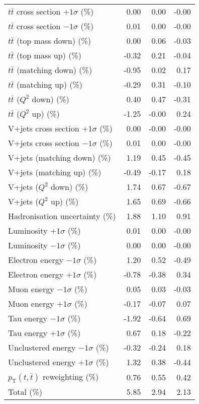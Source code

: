 \begin{table}[htbp]
{\begin{tabular}{lrrr}
$t\bar{t}$ cross section $+1\sigma$ (\%) & 0.00 & 0.00 & -0.00 \\ 
$t\bar{t}$ cross section $-1\sigma$ (\%) & 0.01 & 0.00 & -0.00 \\ 
$t\bar{t}$ (top mass down) (\%) & 0.00 & 0.06 & -0.03 \\ 
$t\bar{t}$ (top mass up) (\%) & -0.32 & 0.21 & -0.04 \\ 
$t\bar{t}$ (matching down) (\%) & -0.95 & 0.02 & 0.17 \\ 
$t\bar{t}$ (matching up) (\%) & -0.29 & 0.31 & -0.10 \\ 
$t\bar{t}$ ($Q^{2}$ down) (\%) & 0.40 & 0.47 & -0.31 \\ 
$t\bar{t}$ ($Q^{2}$ up) (\%) & -1.25 & -0.00 & 0.24 \\ 
V+jets cross section \ensuremath{+1\sigma} (\%) & 0.00 & -0.00 & -0.00 \\ 
V+jets cross section \ensuremath{-1\sigma} (\%) & 0.01 & 0.00 & -0.00 \\ 
V+jets (matching down) (\%) & 1.19 & 0.45 & -0.45 \\ 
V+jets (matching up) (\%) & -0.49 & -0.17 & 0.18 \\ 
V+jets ($Q^{2}$ down) (\%) & 1.74 & 0.67 & -0.67 \\ 
V+jets ($Q^{2}$ up) (\%) & 1.65 & 0.69 & -0.66 \\ 
Hadronisation uncertainty (\%) & 1.88 & 1.10 & 0.91 \\ 
Luminosity $+1\sigma$ (\%) & 0.01 & 0.00 & -0.00 \\ 
Luminosity $-1\sigma$ (\%) & 0.00 & 0.00 & -0.00 \\ 
Electron energy $-1\sigma$ (\%) & 1.20 & 0.52 & -0.49 \\ 
Electron energy $+1\sigma$ (\%) & -0.78 & -0.38 & 0.34 \\ 
Muon energy $-1\sigma$ (\%) & 0.05 & 0.03 & -0.03 \\ 
Muon energy $+1\sigma$ (\%) & -0.17 & -0.07 & 0.07 \\ 
Tau energy $-1\sigma$ (\%) & -1.92 & -0.64 & 0.69 \\ 
Tau energy $+1\sigma$ (\%) & 0.67 & 0.18 & -0.22 \\ 
Unclustered energy $-1\sigma$ (\%) & -0.32 & -0.24 & 0.18 \\ 
Unclustered energy $+1\sigma$ (\%) & 1.32 & 0.38 & -0.44 \\ 
$p_\mathrm{T}(t,\bar{t})$ reweighting (\%) & 0.76 & 0.55 & 0.42 \\ 
\hline 
Total (\%) & 5.85  & 2.94  & 2.13 \\ 
\hline 
\end{tabular}
}
\end{table}

